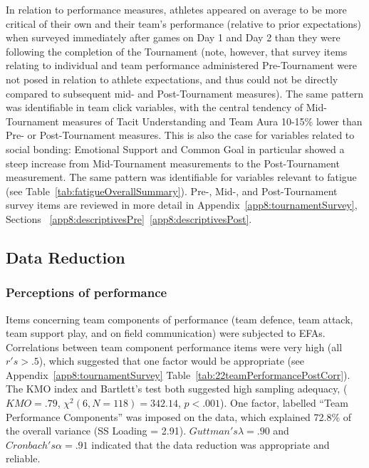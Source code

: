 \begin{CJK}{UTF8}{gbsn}
In relation to performance measures, athletes appeared on average to be more critical of their own and their team’s performance (relative to prior expectations) when surveyed immediately after games on Day 1 and Day 2 than they were following the completion of the Tournament (note, however, that survey items relating to individual and team performance administered Pre-Tournament were not posed in relation to athlete expectations, and thus could not be directly compared to subsequent mid- and Post-Tournament measures).  The same pattern was identifiable in team click variables, with the central tendency of Mid-Tournament measures of Tacit Understanding and Team Aura 10-15\% lower than Pre- or Post-Tournament measures.  This is also the case for variables related to social bonding: Emotional Support and Common Goal in particular showed a steep increase from Mid-Tournament measurements to the Post-Tournament measurement.  The same pattern was identifiable for variables relevant to fatigue (see Table~\ref{tab:fatigueOverallSummary}).
Pre-, Mid-, and Post-Tournament survey items are reviewed in more detail in Appendix~\ref{app8:tournamentSurvey}, Sections ~\ref{app8:descriptivesPre}\nobreakdash~\ref{app8:descriptivesPost}.














\subsection{Data Reduction\label{Ch5:dataReduction}}


\subsubsection{Perceptions of performance}

Items concerning team components of performance (team defence, team attack, team support play, and on field communication) were subjected to EFAs.  Correlations between team component performance items were very high (all $r's > .5$), which suggested that one factor would be appropriate (see Appendix~\ref{app8:tournamentSurvey} Table~\ref{tab:22teamPerformancePostCorr}). The KMO index and Bartlett's test both suggested high sampling adequacy, ($KMO = .79$, $\chi^2(6, N = 118) = 342.14$, $p < .001$).  One factor, labelled ``Team Performance Components'' was imposed on the data, which explained 72.8\% of the overall variance (SS Loading = 2.91). $Guttman's \lambda =.90$ and $Cronbach's\alpha = .91$ indicated that the data reduction was appropriate and reliable.


\end{CJK}
